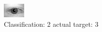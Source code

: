 \begin{figure}[h!]
\begin{center}
\includegraphics[width=0.60\columnwidth]{figures/ID579_class_2_target_3.png}
\end{center}
\caption{ Classification: 2 actual target: 3}
\label{fig:ID579_class_2_target_3}
\end{figure}
